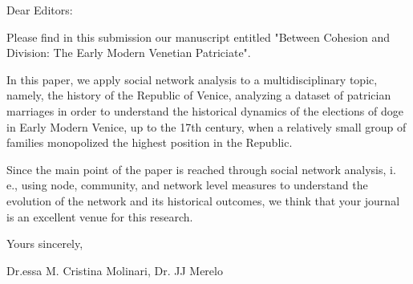 \documentclass[12pt]{article}
\begin{document}
Dear Editors:

Please find in this submission our manuscript entitled "Between Cohesion and
Division: The Early Modern Venetian Patriciate".

In this paper, we apply social network analysis to a multidisciplinary topic,
namely, the history of the Republic of Venice, analyzing a dataset of patrician
marriages in order to understand the historical dynamics of the elections of
doge in Early Modern Venice, up to the 17th century, when a relatively small
group of families monopolized the highest position in the Republic.

Since the main point of the paper is reached through social network analysis,
i. e., using node, community, and network level measures to understand the
evolution of the network and its historical outcomes, we think that your journal
is an excellent venue for this research.

Yours sincerely,

Dr.essa M. Cristina Molinari, Dr. JJ Merelo
\end{document}
